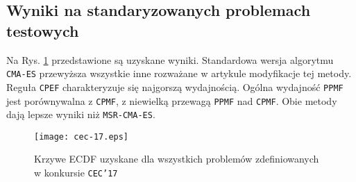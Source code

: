 \subsection{Wyniki na standaryzowanych problemach testowych}

Na Rys. \ref{cec-17} przedstawione są uzyskane wyniki. Standardowa wersja algorytmu \texttt{CMA-ES} przewyższa wszystkie inne
rozważane w artykule modyfikacje tej metody. Reguła \texttt{CPEF} charakteryzuje się najgorszą wydajnością. Ogólna wydajność \texttt{PPMF} jest porównywalna z \texttt{CPMF}, z niewielką przewagą \texttt{PPMF} nad \texttt{CPMF}. Obie metody dają lepsze wyniki niż \texttt{MSR-CMA-ES}.

\begin{figure}[h]
\begin{centering}
\texttt{[image: cec-17.eps]}
\end{centering}
\caption{Krzywe ECDF uzyskane dla wszystkich problemów zdefiniowanych w konkursie \texttt{CEC'17}}
\label{cec-17}
\end{figure}





